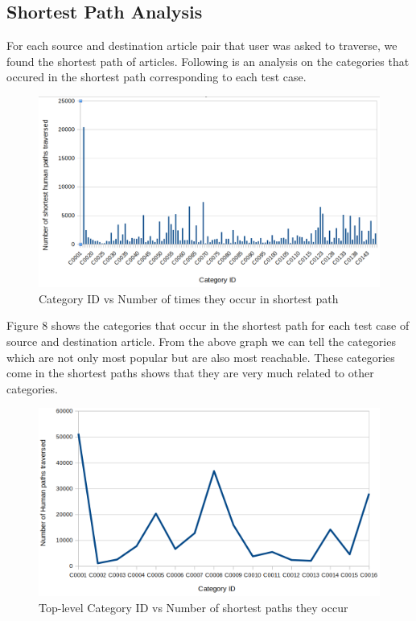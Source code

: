 \documentclass[12pt]{article}
\begin{document}
\subsection{Shortest Path Analysis}
For each source and destination article pair that user was asked to traverse, we found the shortest path of articles. Following is an analysis on the categories that occured in the shortest path corresponding to each test case.
\begin{figure}[h]
    \centering
    \hspace{-60pt}
    \includegraphics[scale = 0.47]{images/q8_number_of_shortest_paths.png}
    \caption{Category ID vs Number of times they occur in shortest path}
\end{figure}

Figure 8 shows the categories that occur in the shortest path for each test case of source and destination article. From the above graph we can tell the categories which are not only most popular but are also most reachable. These categories come in the shortest paths shows that they are very much related to other categories.\\

\begin{figure}[h]
    \centering
    \includegraphics[scale = 0.33]{images/q9_shortest_paths.png}
    \caption{Top-level Category ID vs Number of shortest paths they occur}
\end{figure}
\end{document}
